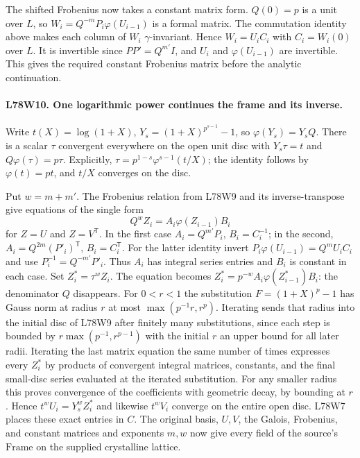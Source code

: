The shifted Frobenius now takes a constant matrix form.
$Q(0)=p$ is a unit over $L$, so
$W_i=Q^{-m}P_i\varphi(U_{i-1})$ is a formal matrix.
The commutation identity above makes each column of $W_i$
$\gamma$-invariant. Hence $W_i=U_i C_i$ with $C_i=W_i(0)$
over $L$. It is invertible since $PP'=Q^{m'}I$, and $U_i$ and
$\varphi(U_{i-1})$ are invertible. This gives the required
constant Frobenius matrix before the analytic continuation.

\paragraph{L78W10. One logarithmic power continues the frame and its inverse.}
Write $t(X)=\log(1+X)$, $Y_s=(1+X)^{p^{s-1}}-1$, so
$\varphi(Y_s)=Y_sQ$. There is a scalar $\tau$ convergent everywhere
on the open unit disc with $Y_s\tau=t$ and
$Q\varphi(\tau)=p\tau$. Explicitly,
$\tau=p^{1-s}\varphi^{s-1}(t/X)$; the identity follows by
$\varphi(t)=pt$, and $t/X$ converges on the disc.

Put $w=m+m'$. The Frobenius relation from L78W9 and its
inverse-transpose give equations of the single form
\[
        Q^w Z_i=A_i\varphi(Z_{i-1})B_i
\]
for $Z=U$ and $Z=V^{\mathsf T}$. In the first case
$A_i=Q^{m'}P_i$, $B_i=C_i^{-1}$; in the second,
$A_i=Q^{2m}(P'_i)^{\mathsf T}$, $B_i=C_i^{\mathsf T}$.
For the latter identity invert
$P_i\varphi(U_{i-1})=Q^m U_i C_i$ and use
$P_i^{-1}=Q^{-m'}P'_i$. Thus $A_i$ has integral series entries
and $B_i$ is constant in each case. Set $Z_i^*=\tau^w Z_i$.
The equation becomes $Z_i^*=p^{-w}A_i\varphi(Z_{i-1}^*)B_i$:
the denominator $Q$ disappears. For $0<r<1$ the substitution
$F=(1+X)^p-1$ has Gauss norm at radius $r$ at most
$\max(p^{-1}r,r^p)$. Iterating sends that radius into the
initial disc of L78W9 after finitely many substitutions, since
each step is bounded by $r\max(p^{-1},r^{p-1})$ with the
initial $r$ an upper bound for all later radii. Iterating the
last matrix equation the same number of times expresses every
$Z_i^*$ by products of convergent integral matrices, constants,
and the final small-disc series evaluated at the iterated
substitution. For any smaller radius this proves convergence of
the coefficients with geometric decay, by bounding at $r$.
Hence $t^wU_i=Y_s^w Z_i^*$ and likewise $t^w V_i$ converge
on the entire open disc. L78W7 places these exact entries in
$C$. The original basis, $U,V$, the Galois, Frobenius, and
constant matrices and exponents $m,w$ now give every field of
the source's $\mathrm{Frame}$ on the supplied crystalline lattice.

